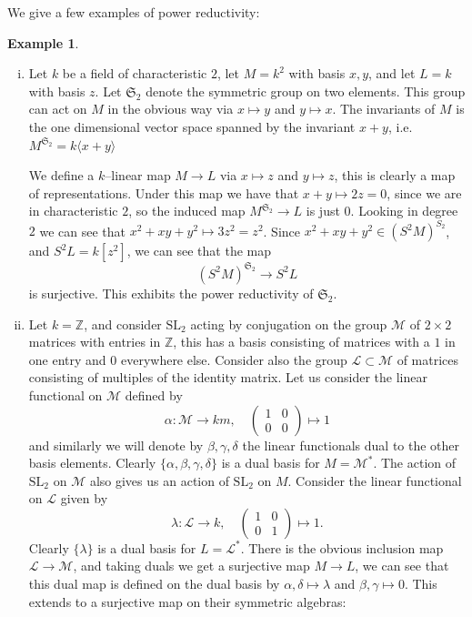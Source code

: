 \documentclass{article}
\theoremstyle{plain}
\theoremstyle{definition}
\newtheorem{Ex}[Th]{Example}
\begin{document}
We  give a few examples of power reductivity:
\begin{Ex}
    \begin{enumerate}[(i)]
        \item Let $k$ be a field of characteristic $2$, let $M=k^2$ with basis $x, y$, and let $L=k$ with basis $z$. Let $\mathfrak{S}_2$ denote the symmetric group on two elements. This group can act on $M$ in the obvious way via $x\mapsto y$ and $y\mapsto x$. The invariants of $M$ is the one dimensional vector space spanned by the invariant $x+y$, i.e. $M^{\mathfrak{S}_2}=k\langle x+y\rangle$
        
        We define a $k$--linear map $M\to L$ via $x\mapsto z$ and $y\mapsto z$, this is clearly a map of representations. Under this map we have that $x+y\mapsto 2z=0$, since we are in characteristic $2$, so the induced map $M^{\mathfrak{S}_2} \to L$ is just $0$. Looking in degree $2$ we can see that $x^2+xy+y^2 \mapsto 3z^2=z^2$. Since $x^2+xy+y^2 \in (S^2M)^{S_2}$, and $S^2L=k[z^2]$, we can see that the map \[(S^2M)^{\mathfrak{S}_2} \to S^2L\] is surjective. This exhibits the power reductivity of $\mathfrak{S}_2$.
    \item Let $k=\mathbb{Z}$, and consider $\mathrm{SL}_2$ acting by conjugation on the group $\mathcal{M}$ of $2\times 2$ matrices with entries in $\mathbb{Z}$, this has a basis consisting of matrices with a $1$ in one entry and $0$ everywhere else. Consider also the group $\mathcal{L} \subset \mathcal{M}$ of matrices consisting of multiples of the identity matrix. Let us consider the linear functional on $\mathcal{M}$ defined by 
    \[
    \alpha\colon \mathcal{M}\to km, \quad \begin{pmatrix}
         1 &0 \\
         0 &0 
    \end{pmatrix}\mapsto 1
    \]
    and similarly we will denote by $\beta, \gamma, \delta$ the linear functionals dual to the other basis elements. Clearly $\{\alpha, \beta, \gamma, \delta\}$ is a dual basis for $M=\mathcal{M}^*$. The action of $\mathrm{SL}_2$ on $\mathcal{M}$ also gives us an action of $\mathrm{SL}_2$ on $M$. Consider  the linear functional on $\mathcal{L}$ given by 
    \[
    \lambda\colon \mathcal{L}\to k, \quad \begin{pmatrix}
         1 &0 \\
         0 &1 
    \end{pmatrix} \mapsto 1.
    \]
     Clearly $\{\lambda\}$ is a dual basis for $L=\mathcal{L}^*$. There is the obvious inclusion map $\mathcal{L}\to \mathcal{M}$, and taking duals we get a surjective map $M\to L$, we can see that this dual map is defined on the dual basis by $\alpha, \delta \mapsto \lambda$ and $\beta, \gamma \mapsto 0$. This extends to a surjective map on their symmetric algebras:

\end{enumerate}
\end{Ex}
\end{document}
